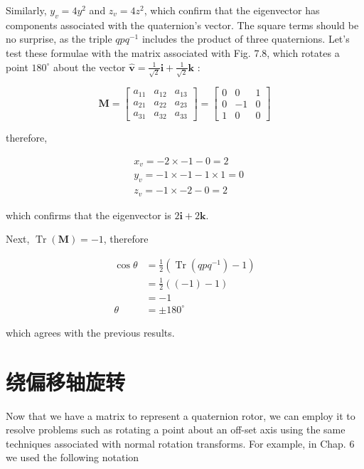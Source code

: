 Similarly, $y_{v}=4 y^{2}$ and $z_{v}=4 z^{2}$, which confirm that the eigenvector has components associated with the quaternion's vector. The square terms should be no surprise, as the triple $q p q^{-1}$ includes the product of three quaternions. Let's test these formulae with the matrix associated with Fig. 7.8, which rotates a point $180^{\circ}$ about the vector $\hat{\mathbf{v}}=\frac{1}{\sqrt{2}} \mathbf{i}+\frac{1}{\sqrt{2}} \mathbf{k}$ :

$$
\mathbf{M}=\left[\begin{array}{lll}
a_{11} & a_{12} & a_{13} \\
a_{21} & a_{22} & a_{23} \\
a_{31} & a_{32} & a_{33}
\end{array}\right]=\left[\begin{array}{ccc}
0 & 0 & 1 \\
0 & -1 & 0 \\
1 & 0 & 0
\end{array}\right]
$$

therefore,

$$
\begin{aligned}
& x_{v}=-2 \times-1-0=2 \\
& y_{v}=-1 \times-1-1 \times 1=0 \\
& z_{v}=-1 \times-2-0=2
\end{aligned}
$$

which confirms that the eigenvector is $2 \mathbf{i}+2 \mathbf{k}$.

Next, $\operatorname{Tr}(\mathbf{M})=-1$, therefore

$$
\begin{aligned}
\cos \theta & =\frac{1}{2}\left(\operatorname{Tr}\left(q p q^{-1}\right)-1\right) \\
& =\frac{1}{2}((-1)-1) \\
& =-1 \\
\theta & =\pm 180^{\circ}
\end{aligned}
$$

which agrees with the previous results.

\section{绕偏移轴旋转}
Now that we have a matrix to represent a quaternion rotor, we can employ it to resolve problems such as rotating a point about an off-set axis using the same techniques associated with normal rotation transforms. For example, in Chap. 6 we used the following notation

